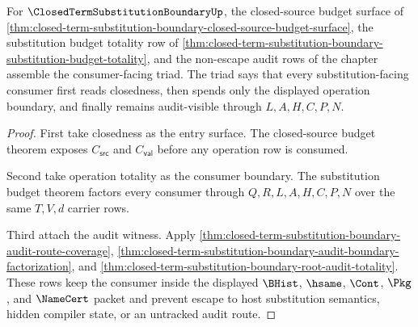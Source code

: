 \begin{theorem}
\label{thm:closed-term-substitution-boundary-consumer-audit-triad}
For $\ClosedTermSubstitutionBoundaryUp$, the closed-source budget surface of \autoref{thm:closed-term-substitution-boundary-closed-source-budget-surface}, the substitution budget totality row of \autoref{thm:closed-term-substitution-boundary-substitution-budget-totality}, and the non-escape audit rows of the chapter assemble the consumer-facing triad. The triad says that every substitution-facing consumer first reads closedness, then spends only the displayed operation boundary, and finally remains audit-visible through $L,A,H,C,P,N$.
\end{theorem}
\begin{proof}
First take closedness as the entry surface. The closed-source budget theorem exposes $C_{\mathsf{src}}$ and $C_{\mathsf{val}}$ before any operation row is consumed.

Second take operation totality as the consumer boundary. The substitution budget theorem factors every consumer through $Q,R,L,A,H,C,P,N$ over the same $T,V,d$ carrier rows.

Third attach the audit witness. Apply \autoref{thm:closed-term-substitution-boundary-audit-route-coverage}, \autoref{thm:closed-term-substitution-boundary-audit-boundary-factorization}, and \autoref{thm:closed-term-substitution-boundary-root-audit-totality}. These rows keep the consumer inside the displayed $\BHist$, $\hsame$, $\Cont$, $\Pkg$, and $\NameCert$ packet and prevent escape to host substitution semantics, hidden compiler state, or an untracked audit route.
\end{proof}

